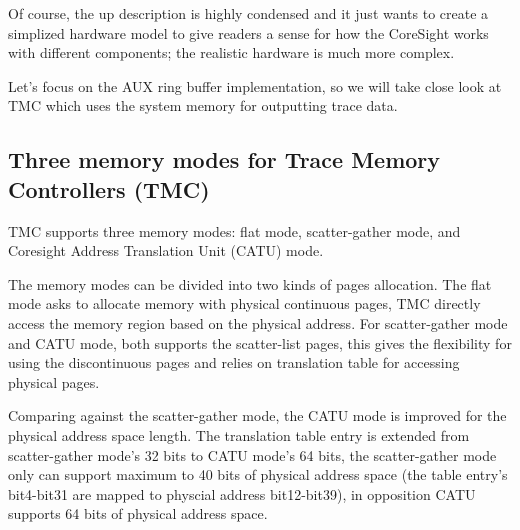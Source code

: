 \documentclass[11pt]{diazessay} %
\begin{document}
Of course, the up description is highly condensed and it just wants to create a simplized hardware model to give readers a sense for how the CoreSight works with different components; the realistic hardware is much more complex.

Let's focus on the AUX ring buffer implementation, so we will take close look at TMC which uses the system memory for outputting trace data.

\subsection*{Three memory modes for Trace Memory Controllers (TMC)}

TMC supports three memory modes: flat mode, scatter-gather mode, and Coresight Address Translation Unit (CATU) mode.

The memory modes can be divided into two kinds of pages allocation.  The flat mode asks to allocate memory with physical continuous pages, TMC directly access the memory region based on the physical address.  For scatter-gather mode and CATU mode, both supports the scatter-list pages, this gives the flexibility for using the discontinuous pages and relies on translation table for accessing physical pages.

Comparing against the scatter-gather mode, the CATU mode is improved for the physical address space length.  The translation table entry is extended from scatter-gather mode's 32 bits to CATU mode's 64 bits, the scatter-gather mode only can support maximum to 40 bits of physical address space (the table entry's bit4-bit31 are mapped to physcial address bit12-bit39), in opposition CATU supports 64 bits of physical address space.
\end{document}

